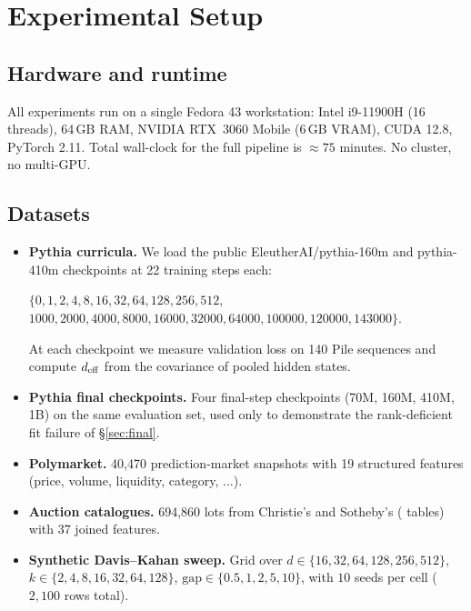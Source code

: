 \section{Experimental Setup}
\label{sec:setup}

\subsection{Hardware and runtime}
All experiments run on a single Fedora 43 workstation:
Intel i9-11900H (16 threads), 64\,GB RAM, NVIDIA RTX~3060 Mobile (6\,GB
VRAM), CUDA 12.8, PyTorch 2.11. Total wall-clock for the full pipeline is
$\approx 75$ minutes. No cluster, no multi-GPU.

\subsection{Datasets}
\begin{itemize}[leftmargin=1.5em,itemsep=1pt]
\item \textbf{Pythia curricula.} We load the public EleutherAI/pythia-160m and
      pythia-410m checkpoints at 22 training steps each:
      \begin{center}\small
      $\{0, 1, 2, 4, 8, 16, 32, 64, 128, 256, 512,$\\
      $1000, 2000, 4000, 8000, 16000, 32000, 64000, 100000, 120000, 143000\}$.
      \end{center}
      At each checkpoint we measure validation
      loss on 140 Pile sequences and compute $d_{\mathrm{eff}}$ from the covariance of
      pooled hidden states.
\item \textbf{Pythia final checkpoints.} Four final-step checkpoints
      (70M, 160M, 410M, 1B) on the same evaluation set, used only to
      demonstrate the rank-deficient fit failure of \S\ref{sec:final}.
\item \textbf{Polymarket.} 40{,}470 prediction-market snapshots with 19
      structured features (price, volume, liquidity, category, ...).
\item \textbf{Auction catalogues.} 694{,}860 lots from Christie's and
      Sotheby's ( tables) with 37 joined
      features.
\item \textbf{Synthetic Davis--Kahan sweep.} Grid over
      $d \in \{16,32,64,128,256,512\}$,
      $k \in \{2,4,8,16,32,64,128\}$,
      $\mathrm{gap} \in \{0.5,1,2,5,10\}$, with $10$ seeds per cell
      ($2{,}100$ rows total).
\end{itemize}

